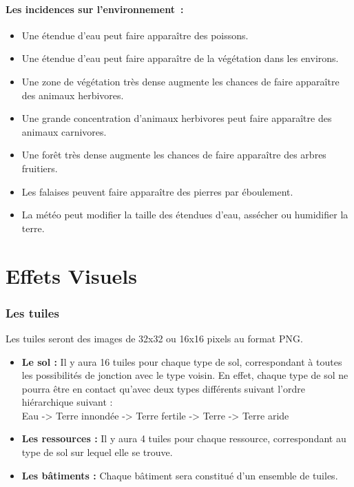 \documentclass[a4paper]{article}
\begin{document}
      \subsection{Les incidences sur l'environnement :}
        \begin{itemize} \small
          \item Une étendue d'eau peut faire apparaître des poissons.
          \item Une étendue d'eau peut faire apparaître de la végétation dans les environs.
          \item Une zone de végétation très dense augmente les chances de faire apparaître des animaux herbivores.
          \item Une grande concentration d'animaux herbivores peut faire apparaître des animaux carnivores.
          \item Une forêt très dense augmente les chances de faire apparaître des arbres fruitiers.
          \item Les falaises peuvent faire apparaître des pierres par éboulement.
          \item La météo peut modifier la taille des étendues d'eau, assécher ou humidifier la terre.
        \end{itemize} \normalsize


  \newpage
  \part{Effets Visuels}


    \section{Les tuiles}
      \label{Tuile}
      Les tuiles seront des images de 32x32 ou 16x16 pixels au format PNG.\\
      \begin{itemize} \small
        \item \textbf{Le sol :} Il y aura 16 tuiles pour chaque type de sol, correspondant à toutes les possibilités de jonction avec le type voisin. En effet, chaque type de sol ne pourra être en contact qu'avec deux types différents suivant l'ordre hiérarchique suivant :\\
          Eau -> Terre innondée -> Terre fertile -> Terre -> Terre aride
        \item \textbf{Les ressources :} Il y aura 4 tuiles pour chaque ressource, correspondant au type de sol sur lequel elle se trouve.
        \item \textbf{Les bâtiments :} Chaque bâtiment sera constitué d'un ensemble de tuiles.
      \end{itemize} \normalsize
  
\end{document}
